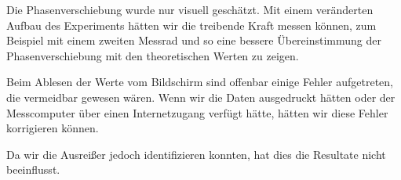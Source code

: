 \documentclass[a4paper,german,12pt,smallheadings]{scrartcl}
\begin{document}
Die Phasenverschiebung wurde nur visuell geschätzt. Mit einem veränderten
Aufbau des Experiments hätten wir die treibende Kraft messen können, zum
Beispiel mit einem zweiten Messrad und so eine bessere Übereinstimmung der
Phasenverschiebung mit den theoretischen Werten zu zeigen.

Beim Ablesen der Werte vom Bildschirm sind offenbar einige Fehler aufgetreten,
die vermeidbar gewesen wären.  Wenn wir die Daten ausgedruckt hätten oder der
Messcomputer über einen Internetzugang verfügt hätte, hätten wir diese Fehler
korrigieren können.

Da wir die Ausreißer jedoch identifizieren konnten, hat dies die Resultate
nicht beeinflusst.

\newpage
\label{plot:damp}
\begin{landscape}
  
\end{landscape}

\newpage
\label{plot:amp}
\begin{landscape}
  
\end{landscape}
\end{document}
